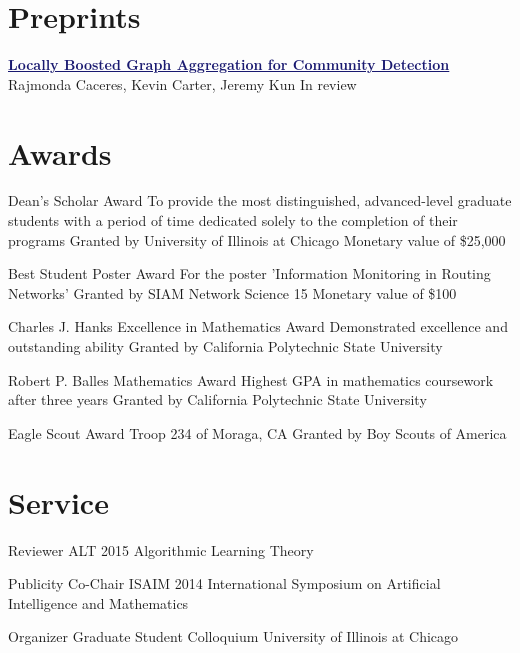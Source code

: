 \documentclass[11pt]{moderncv}
\begin{document}
   \section{Preprints}
         \cventry{}
         {\href{http://arxiv.org/abs/1405.3210}{\textcolor{MidnightBlue}{\underline{\textbf{Locally Boosted Graph Aggregation for Community Detection}}}}}
      {}
      {Rajmonda Caceres, Kevin Carter, Jeremy Kun}
      {}
      {In review}


   \section{Awards}
         {Dean's Scholar Award}
      {To provide the most distinguished, advanced-level graduate students with a period of time dedicated solely to the completion of their programs}
      {Granted by University of Illinois at Chicago}
      {}
      {Monetary value of \$25,000}

         {Best Student Poster Award}
      {For the poster 'Information Monitoring in Routing Networks'}
      {Granted by SIAM Network Science 15}
      {}
      {Monetary value of \$100}

         {Charles J. Hanks Excellence in Mathematics Award}
      {Demonstrated excellence and outstanding ability}
      {Granted by California Polytechnic State University}
      {}
{}

         {Robert P. Balles Mathematics Award}
      {Highest GPA in mathematics coursework after three years}
      {Granted by California Polytechnic State University}
      {}
{}

         {Eagle Scout Award}
      {Troop 234 of Moraga, CA}
      {Granted by Boy Scouts of America}
      {}
{}


   \section{Service}
         {Reviewer}
      {ALT 2015}
      {Algorithmic Learning Theory}
      {}
{}

         {Publicity Co-Chair}
      {ISAIM 2014}
      {International Symposium on Artificial Intelligence and Mathematics}
      {}
{}

         {Organizer}
      {Graduate Student Colloquium}
      {University of Illinois at Chicago}
      {}
{}
\end{document}
